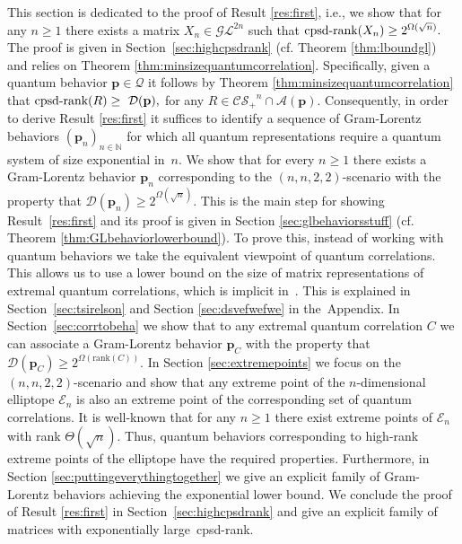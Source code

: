 \documentclass{siamart}
\begin{document}
{{This  section is dedicated to the proof of Result \ref{res:first}, i.e., we show that for   any $n\ge 1$ there  exists a matrix   $X_n\in {\mathcal{GL}}^{2n}$ such that
$ {\mathrm{cpsd}\textnormal{-rank}}(X_n)\ge  2^{\Omega(\sqrt{n})}.$ The proof is given  in Section~\ref{sec:highcpsdrank} (cf.  Theorem \ref{thm:lboundgl}) {and} relies on Theorem \ref{thm:minsizequantumcorrelation}.
 Specifically,  given a quantum behavior ${\mathbf{p}} \in {\mathcal{Q}}$ it follows   by Theorem \ref{thm:minsizequantumcorrelation}  that ${\mathrm{cpsd}\textnormal{-rank}}(R)\ge~\mathcal{D}({\mathbf{p}}),$ for any $  R\in {\mathcal{CS}_+}^n\cap \mathcal{A}({\mathbf{p}})$.
 Consequently, in order to derive   Result \ref{res:first}  it suffices to identify a sequence  of  Gram-Lorentz  behaviors $({\mathbf{p}}_n)_{n\in \mathbb{N}}$  for which  all quantum representations require a quantum system of size exponential in~$n$.    We show that for every $n\ge 1$ there exists a Gram-Lorentz behavior ${\mathbf{p}}_n$ corresponding to the $(n,n,2,2)$-scenario with the property that  $\mathcal{D}({\mathbf{p}}_n)\ge 2^{\Omega(\sqrt{n})}.$  This is the main step for showing  Result~\ref{res:first} and its proof is given in
 Section \ref{sec:glbehaviorsstuff} (cf. Theorem \ref{thm:GLbehaviorlowerbound}).  To prove this, instead of working with quantum behaviors we take the equivalent viewpoint of quantum correlations.  This allows us to use  a lower bound  on the size of matrix  representations of extremal quantum correlations, which is implicit in~\cite{TS87}. This is explained in Section~\ref{sec:tsirelson} and Section \ref{sec:dsvefwefwe}   in the~Appendix.
In Section~\ref{sec:corrtobeha}   we show  that to any extremal
quantum correlation $C$  we can associate a Gram-Lorentz behavior
${\mathbf{p}}_C$  with the property that  $\mathcal{D}({\mathbf{p}}_C)\ge
2^{\Omega({\mathrm{rank}}(C))}$. In Section \ref{sec:extremepoints} we focus
on the  {$(n,n,2,2)$-scenario} and show that any extreme point of
the $n$-dimensional elliptope ${\mathcal{E}}_n$  is also an extreme point of
the corresponding set of quantum correlations.
  It is well-known that for any $n\ge1 $ there exist extreme points of ${\mathcal{E}}_n$ with rank $\Theta(\sqrt{n})$. Thus,   quantum behaviors corresponding to high-rank extreme points of the elliptope  have the required properties.   Furthermore, in Section \ref{sec:puttingeverythingtogether} we give an explicit family  of Gram-Lorentz behaviors achieving the exponential lower bound. We conclude the proof of Result \ref{res:first} in Section~\ref{sec:highcpsdrank} and give an explicit family of matrices with exponentially large~cpsd-rank.}

}
\end{document}
